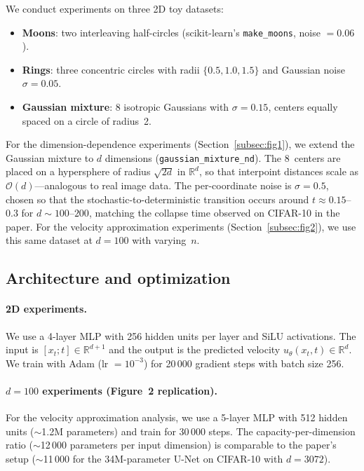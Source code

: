 \documentclass[10pt,a4paper]{article}
\theoremstyle{definition}
\newcommand{\R}{\mathbb{R}}
\begin{document}
We conduct experiments on three 2D toy datasets:
\begin{itemize}[nosep,leftmargin=1.5em]
    \item \textbf{Moons}: two interleaving half-circles (scikit-learn's \texttt{make\_moons}, noise $= 0.06$).
    \item \textbf{Rings}: three concentric circles with radii $\{0.5, 1.0, 1.5\}$ and Gaussian noise $\sigma = 0.05$.
    \item \textbf{Gaussian mixture}: 8 isotropic Gaussians with $\sigma = 0.15$, centers equally spaced on a circle of radius~2.
\end{itemize}
For the dimension-dependence experiments (Section~\ref{subsec:fig1}), we extend the Gaussian mixture to $d$ dimensions (\texttt{gaussian\_mixture\_nd}).
The 8~centers are placed on a hypersphere of radius $\sqrt{2d}$ in $\R^d$, so that interpoint distances scale as $\mathcal{O}(d)$---analogous to real image data.
The per-coordinate noise is $\sigma = 0.5$, chosen so that the stochastic-to-deterministic transition occurs around $t \approx 0.15$--$0.3$ for $d \sim 100$--$200$, matching the collapse time observed on CIFAR-10 in the paper.
For the velocity approximation experiments (Section~\ref{subsec:fig2}), we use this same dataset at $d = 100$ with varying~$n$.

\subsection{Architecture and optimization}

\paragraph{2D experiments.}
We use a 4-layer MLP with 256 hidden units per layer and SiLU activations.
The input is $[x_t; t] \in \R^{d+1}$ and the output is the predicted velocity $u_\theta(x_t, t) \in \R^d$.
We train with Adam (lr $= 10^{-3}$) for 20\,000 gradient steps with batch size 256.

\paragraph{$d = 100$ experiments (Figure~2 replication).}
For the velocity approximation analysis, we use a 5-layer MLP with 512 hidden units (${\sim}$1.2M parameters) and train for 30\,000 steps.
The capacity-per-dimension ratio (${\sim}$12\,000 parameters per input dimension) is comparable to the paper's setup (${\sim}$11\,000 for the 34M-parameter U-Net on CIFAR-10 with $d = 3072$).
\end{document}
